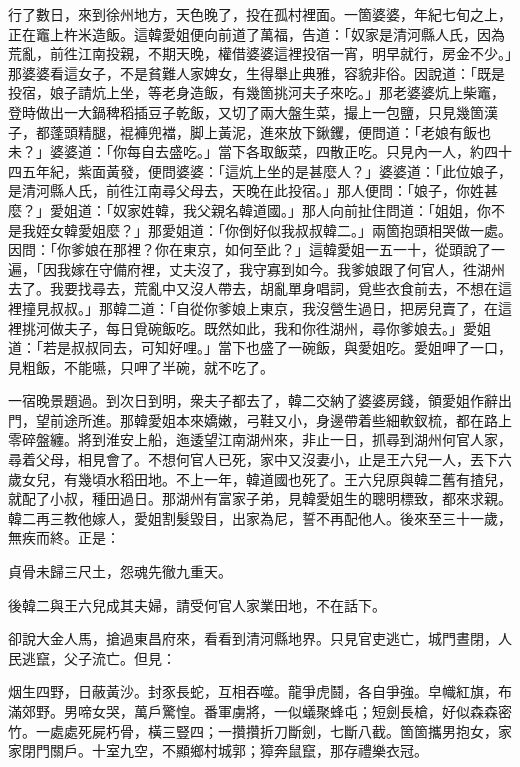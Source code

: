 行了數日，來到徐州地方，天色晚了，投在孤村裡面。一箇婆婆，年紀七旬之上，正在竈上杵米造飯。這韓愛姐便向前道了萬福，告道：「奴家是清河縣人氏，因為荒亂，前徃江南投親，不期天晚，權借婆婆這裡投宿一宵，明早就行，房金不少。」那婆婆看這女子，不是貧難人家婢女，生得舉止典雅，容貌非俗。因說道：「既是投宿，娘子請炕上坐，等老身造飯，有幾箇挑河夫子來吃。」那老婆婆炕上柴竈，登時做出一大鍋稗稻插豆子乾飯，又切了兩大盤生菜，撮上一包鹽，只見幾箇漢子，都蓬頭精腿，裩褲兜襠，脚上黃泥，進來放下鍬钁，便問道：「老娘有飯也未？」婆婆道：「你每自去盛吃。」當下各取飯菜，四散正吃。只見內一人，約四十四五年紀，紫面黃發，便問婆婆：「這炕上坐的是甚麼人？」婆婆道：「此位娘子，是清河縣人氏，前徃江南尋父母去，天晚在此投宿。」那人便問：「娘子，你姓甚麼？」愛姐道：「奴家姓韓，我父親名韓道國。」那人向前扯住問道：「姐姐，你不是我姪女韓愛姐麼？」那愛姐道：「你倒好似我叔叔韓二。」兩箇抱頭相哭做一處。因問：「你爹娘在那裡？你在東京，如何至此？」這韓愛姐一五一十，從頭說了一遍，「因我嫁在守備府裡，丈夫沒了，我守寡到如今。我爹娘跟了何官人，徃湖州去了。我要找尋去，荒亂中又沒人帶去，胡亂單身唱詞，覓些衣食前去，不想在這裡撞見叔叔。」那韓二道：「自從你爹娘上東京，我沒營生過日，把房兒賣了，在這裡挑河做夫子，每日覓碗飯吃。既然如此，我和你徃湖州，尋你爹娘去。」愛姐道：「若是叔叔同去，可知好哩。」當下也盛了一碗飯，與愛姐吃。愛姐呷了一口，見粗飯，不能嚥，只呷了半碗，就不吃了。

一宿晚景題過。到次日到明，衆夫子都去了，韓二交納了婆婆房錢，領愛姐作辭出門，望前途所進。那韓愛姐本來嬌嫩，弓鞋又小，身邊帶着些細軟釵梳，都在路上零碎盤纏。將到淮安上船，迤逶望江南湖州來，非止一日，抓尋到湖州何官人家，尋着父母，相見會了。不想何官人已死，家中又沒妻小，止是王六兒一人，丟下六歲女兒，有幾頃水稻田地。不上一年，韓道國也死了。王六兒原與韓二舊有揸兒，就配了小叔，種田過日。{}那湖州有富家子弟，見韓愛姐生的聰明標致，都來求親。韓二再三教他嫁人，愛姐割髮毀目，出家為尼，誓不再配他人。{}後來至三十一歲，無疾而終。正是：

貞骨未歸三尺土，怨魂先徹九重天。

後韓二與王六兒成其夫婦，請受何官人家業田地，不在話下。

卻說大金人馬，搶過東昌府來，看看到清河縣地界。只見官吏逃亡，城門晝閉，人民逃竄，父子流亡。但見：

烟生四野，日蔽黃沙。封豕長蛇，互相吞噬。龍爭虎鬪，各自爭強。皁幟紅旗，布滿郊野。男啼女哭，萬戶驚惶。番軍虜將，一似蟻聚蜂屯；短劍長槍，好似森森密竹。一處處死屍朽骨，橫三豎四；一攢攢折刀斷劍，七斷八截。箇箇攜男抱女，家家閉門關戶。十室九空，不顯鄉村城郭；獐奔鼠竄，那存禮樂衣冠。

